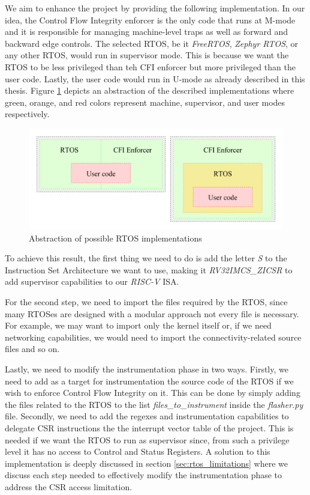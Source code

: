 We aim to enhance the project by providing the following implementation. In our
idea, the Control Flow Integrity enforcer is the only code that runs at M-mode and
it is responsible for managing machine-level traps as well as forward and backward
edge controls. The selected RTOS, be it \textit{FreeRTOS}, \textit{Zephyr RTOS},
or any other RTOS, would run in supervisor mode. This is because we want the RTOS
to be less privileged than teh CFI enforcer but more privileged than the user code.
Lastly, the user code would run in U-mode as already described in this thesis.
Figure \ref{fig:rtos} depicts an abstraction of the described implementations
where green, orange, and red colors represent machine, supervisor, and user
modes respectively. \\
\begin{figure}[htbp]
  \centering
  \includegraphics[width=\linewidth]{images/rtos.png}
  \caption{Abstraction of possible RTOS implementations}
  \label{fig:rtos}
\end{figure}

To achieve this result, the first thing we need to do is add the letter \textit{S}
to the Instruction Set Architecture we want to use, making it \textit{RV32IMCS\_ZICSR}
to add supervisor capabilities to our \textit{RISC-V} ISA.

For the second step, we need to import the files required by the RTOS, since many
RTOSes are designed with a modular approach not every file is necessary. For
example, we may want to import only the kernel itself or, if we need networking
capabilities, we would need to import the connectivity-related source files and so
on.

Lastly, we need to modify the instrumentation phase in two ways. Firstly, we
need to add as a target for instrumentation the source code of the RTOS if we
wish to enforce Control Flow Integrity on it. This can be done by simply adding the
files related to the RTOS to the list \textit{files\_to\_instrument} inside the
\textit{flasher.py} file. Secondly, we need to add the regexes and instrumentation
capabilities to delegate CSR instructions the the interrupt vector table of the project.
This is needed if we want the RTOS to run as supervisor since, from such a privilege
level it has no access to Control and Status Registers. A solution to this
implementation is deeply discussed in section \ref{sec:rtos_limitations} where
we discuss each step needed to effectively modify the instrumentation phase to
address the CSR access limitation.


